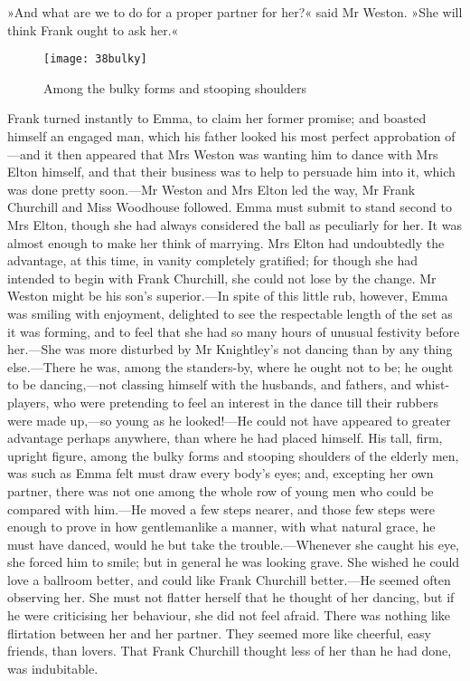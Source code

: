 »And what are we to do for a proper partner for her?« said Mr Weston. »She will think Frank ought to ask her.«

\begin{figure}[tbph]
\centering
\texttt{[image: 38bulky]}
\caption{Among the bulky forms and stooping shoulders}
\end{figure}

Frank turned instantly to Emma, to claim her former promise; and boasted himself an engaged man, which his father looked his most perfect approbation of—and it then appeared that Mrs Weston was wanting him to dance with Mrs Elton himself, and that their business was to help to persuade him into it, which was done pretty soon.—Mr Weston and Mrs Elton led the way, Mr Frank Churchill and Miss Woodhouse followed. Emma must submit to stand second to Mrs Elton, though she had always considered the ball as peculiarly for her. It was almost enough to make her think of marrying. Mrs Elton had undoubtedly the advantage, at this time, in vanity completely gratified; for though she had intended to begin with Frank Churchill, she could not lose by the change. Mr Weston might be his son's superior.—In spite of this little rub, however, Emma was smiling with enjoyment, delighted to see the respectable length of the set as it was forming, and to feel that she had so many hours of unusual festivity before her.—She was more disturbed by Mr Knightley's not dancing than by any thing else.—There he was, among the standers-by, where he ought not to be; he ought to be dancing,—not classing himself with the husbands, and fathers, and whist-players, who were pretending to feel an interest in the dance till their rubbers were made up,—so young as he looked!—He could not have appeared to greater advantage perhaps anywhere, than where he had placed himself. His tall, firm, upright figure, among the bulky forms and stooping shoulders of the elderly men, was such as Emma felt must draw every body's eyes; and, excepting her own partner, there was not one among the whole row of young men who could be compared with him.—He moved a few steps nearer, and those few steps were enough to prove in how gentlemanlike a manner, with what natural grace, he must have danced, would he but take the trouble.—Whenever she caught his eye, she forced him to smile; but in general he was looking grave. She wished he could love a ballroom better, and could like Frank Churchill better.—He seemed often observing her. She must not flatter herself that he thought of her dancing, but if he were criticising her behaviour, she did not feel afraid. There was nothing like flirtation between her and her partner. They seemed more like cheerful, easy friends, than lovers. That Frank Churchill thought less of her than he had done, was indubitable.

